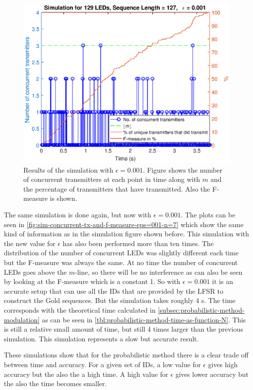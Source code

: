 \begin{figure}[ht]
	\centering
	\includegraphics[width=\textwidth]{chapters/evaluation-chapters/simulation/sim-concurrent-tx-and-f-measure-eps=001-n=7.eps}
	\caption{Results of the simulation with $\epsilon = 0.001$. Figure shows the number of concurrent transmitters at each point in time along with $m$ and the percentage of transmitters that have transmitted. Also the F-measure is shown.}
	\label{fig:sim-concurrent-tx-and-f-measure-eps=001-n=7}
\end{figure}






The same simulation is done again, but now with $\epsilon = 0.001$.
The plots can be seen in \autoref{fig:sim-concurrent-tx-and-f-measure-eps=001-n=7} which show the same kind of information as in the simulation figure shown before.
This simulation with the new value for $\epsilon$ has also been performed more than ten times.
The distribution of the number of concurrent LEDs was slightly different each time but the F-measure was always the same.
At no time the number of concurrent LEDs goes above the $m$-line, so there will be no interference as can also be seen by looking at the F-measure which is a constant 1.
So with $\epsilon = 0.001$ it is an accurate setup that can use all the IDs that are provided by the LFSR to construct the Gold sequences.
But the simulation takes roughly 4 s.
The time corresponds with the theoretical time calculated in \autoref{subsec:probabilistic-method-modulation} as can be seen in \autoref{tbl:probabilistic-method-time-as-function-N}.
This is still a relative small amount of time, but still 4 times larger than the previous simulation.
This simulation represents a slow but accurate result.



 

These simulations show that for the probabilistic method there is a clear trade off between time and accuracy.
For a given set of IDs, a low value for $\epsilon$ gives high accuracy but the also the a high time.
A high value for $\epsilon$ gives lower accuracy but the also the time becomes smaller.